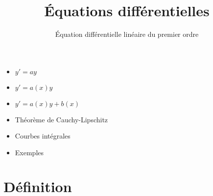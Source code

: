 







\title{{\bf \'Equations différentielles}}
\subtitle{\'Equation différentielle linéaire du premier ordre}

\begin{frame}
  
  \debutmontitre

  \pause

{\footnotesize
\hfill
{}
\begin{minipage}{0.6\textwidth}
  \begin{itemize}
    \item<3-> $y'=ay$
    \item<4-> $y'=a(x)y$
    \item<5-> $y' = a(x)y+b(x)$
    \item<6-> Théorème de Cauchy-Lipschitz
    \item<7-> Courbes intégrales
    \item<8-> Exemples
  \end{itemize}
\end{minipage}
}

\end{frame}

\setcounter{framenumber}{0}

\section*{Définition}

